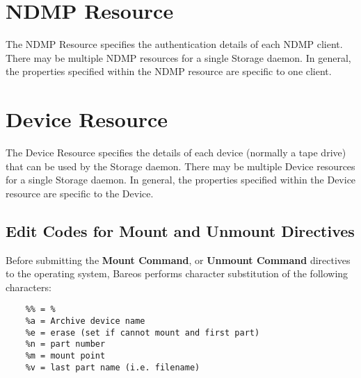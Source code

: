 \section{NDMP Resource}
\label{NDMPResource}

The NDMP Resource specifies the authentication details of each NDMP client.
There may be multiple NDMP resources for a single Storage daemon. In general,
the properties specified within the NDMP resource are specific to one client.







\section{Device Resource}
\label{DeviceResource}

The Device Resource specifies the details of each device (normally a tape
drive) that can be used by the Storage daemon.  There may be multiple
Device resources for a single Storage daemon.  In general, the properties
specified within the Device resource are specific to the Device.






\subsection{Edit Codes for Mount and Unmount Directives}
\label{mountcodes}

Before submitting the {\bf Mount Command}, or {\bf Unmount Command}
directives to the operating system, Bareos performs character substitution
of the following characters:

\footnotesize
\begin{verbatim}
    %% = %
    %a = Archive device name
    %e = erase (set if cannot mount and first part)
    %n = part number
    %m = mount point
    %v = last part name (i.e. filename)
\end{verbatim}
\normalsize

